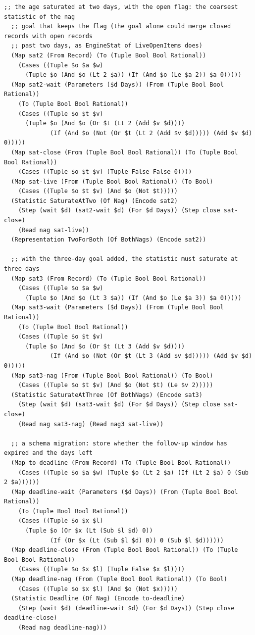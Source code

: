 \documentclass[11pt]{article}
\theoremstyle{definition}
\theoremstyle{plain}
\begin{document}
\begin{lstlisting}[style=mettamod]
  ;; the age saturated at two days, with the open flag: the coarsest statistic of the nag
  ;; goal that keeps the flag (the goal alone could merge closed records with open records
  ;; past two days, as EngineStat of LiveOpenItems does)
  (Map sat2 (From Record) (To (Tuple Bool Bool Rational))
    (Cases ((Tuple $o $a $w)
      (Tuple $o (And $o (Lt 2 $a)) (If (And $o (Le $a 2)) $a 0)))))
  (Map sat2-wait (Parameters ($d Days)) (From (Tuple Bool Bool Rational))
    (To (Tuple Bool Bool Rational))
    (Cases ((Tuple $o $t $v)
      (Tuple $o (And $o (Or $t (Lt 2 (Add $v $d))))
             (If (And $o (Not (Or $t (Lt 2 (Add $v $d))))) (Add $v $d) 0)))))
  (Map sat-close (From (Tuple Bool Bool Rational)) (To (Tuple Bool Bool Rational))
    (Cases ((Tuple $o $t $v) (Tuple False False 0))))
  (Map sat-live (From (Tuple Bool Bool Rational)) (To Bool)
    (Cases ((Tuple $o $t $v) (And $o (Not $t)))))
  (Statistic SaturateAtTwo (Of Nag) (Encode sat2)
    (Step (wait $d) (sat2-wait $d) (For $d Days)) (Step close sat-close)
    (Read nag sat-live))
  (Representation TwoForBoth (Of BothNags) (Encode sat2))

  ;; with the three-day goal added, the statistic must saturate at three days
  (Map sat3 (From Record) (To (Tuple Bool Bool Rational))
    (Cases ((Tuple $o $a $w)
      (Tuple $o (And $o (Lt 3 $a)) (If (And $o (Le $a 3)) $a 0)))))
  (Map sat3-wait (Parameters ($d Days)) (From (Tuple Bool Bool Rational))
    (To (Tuple Bool Bool Rational))
    (Cases ((Tuple $o $t $v)
      (Tuple $o (And $o (Or $t (Lt 3 (Add $v $d))))
             (If (And $o (Not (Or $t (Lt 3 (Add $v $d))))) (Add $v $d) 0)))))
  (Map sat3-nag (From (Tuple Bool Bool Rational)) (To Bool)
    (Cases ((Tuple $o $t $v) (And $o (Not $t) (Le $v 2)))))
  (Statistic SaturateAtThree (Of BothNags) (Encode sat3)
    (Step (wait $d) (sat3-wait $d) (For $d Days)) (Step close sat-close)
    (Read nag sat3-nag) (Read nag3 sat-live))

  ;; a schema migration: store whether the follow-up window has expired and the days left
  (Map to-deadline (From Record) (To (Tuple Bool Bool Rational))
    (Cases ((Tuple $o $a $w) (Tuple $o (Lt 2 $a) (If (Lt 2 $a) 0 (Sub 2 $a))))))
  (Map deadline-wait (Parameters ($d Days)) (From (Tuple Bool Bool Rational))
    (To (Tuple Bool Bool Rational))
    (Cases ((Tuple $o $x $l)
      (Tuple $o (Or $x (Lt (Sub $l $d) 0))
             (If (Or $x (Lt (Sub $l $d) 0)) 0 (Sub $l $d))))))
  (Map deadline-close (From (Tuple Bool Bool Rational)) (To (Tuple Bool Bool Rational))
    (Cases ((Tuple $o $x $l) (Tuple False $x $l))))
  (Map deadline-nag (From (Tuple Bool Bool Rational)) (To Bool)
    (Cases ((Tuple $o $x $l) (And $o (Not $x)))))
  (Statistic Deadline (Of Nag) (Encode to-deadline)
    (Step (wait $d) (deadline-wait $d) (For $d Days)) (Step close deadline-close)
    (Read nag deadline-nag)))


\end{lstlisting}
\end{document}
